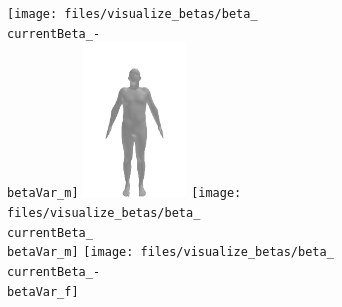 \begin{figure}[ht!]
    \def\betaVar{3}
    \def\imgWidth{0.3\textwidth}
    \def\betaWidth{0.3\textwidth}
    \centering
    \begin{subfigure}{\betaWidth}
        \def\currentBeta{0}
        \centering
        \texttt{[image: files/visualize\_betas/beta\_\\currentBeta\_-\\betaVar\_m]}
        \includegraphics[width=\imgWidth]{files/visualize_betas/baseline_m}
        \texttt{[image: files/visualize\_betas/beta\_\\currentBeta\_\\betaVar\_m]}
        \linebreak
        \texttt{[image: files/visualize\_betas/beta\_\\currentBeta\_-\\betaVar\_f]}

\end{subfigure}
\end{figure}

